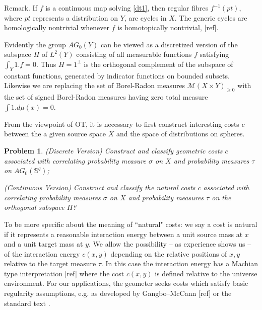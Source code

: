 \documentclass[12pt]{amsart}
\newtheorem{prob}{Problem}
\theoremstyle{definition}
\theoremstyle{remark}
\newcommand{\bZ}{\mathbb{Z}}
\begin{document}
Remark. If $f$ is a continuous map solving \ref{dt1}, then regular fibres $f^{-1}(pt)$, where $pt$ represents a distribution on $Y$, are cycles in $X$. The generic cycles are homologically nontrivial whenever $f$ is homotopically nontrivial, [ref].



Evidently the group $AG_0(Y)$ can be viewed as a discretized version of the subspace $H$ of $L^2(Y)$ consisting of all measurable functions $f$ satisfying $\int_Y 1. f=0$. Thus $H=1^{\perp}$ is the orthogonal complement of the subspace of constant functions, generated by indicator functions on bounded subsets. Likewise we are replacing the set of Borel-Radon measures $\mathscr{M}(X\times Y)_{\geq 0}$ with the set of signed Borel-Radon measures having zero total measure $\int 1. d\mu(x) =0$.

From the viewpoint of OT, it is necessary to first construct interesting costs $c$ between the a given source space $X$ and the space of distributions on spheres.

\begin{prob} 
(Discrete Version) Construct and classify geometric costs $c$ associated with correlating probability measure $\sigma$ on $X$ and probability measures $\tau$ on $AG_0(\mathbb{S}^q)$;

(Continuous Version) Construct and classify the natural costs $c$ associated with correlating probability measures $\sigma$ on $X$ and probability measures $\tau$ on the orthogonal subspace $H$? 
\end{prob}

To be more specific about the meaning of ``natural" costs: we say a cost is natural if it represents a reasonable interaction energy between a unit source mass at $x$ and a unit target mass at $y$. We allow the possibility -- as experience shows us -- of the interaction energy $c(x,y)$ depending on the relative positions of $x,y$ relative to the target measure $\tau$. In this case the interaction energy has a Machian type interpretation [ref] where the cost $c(x,y)$ is defined relative to the universe environment. For our applications, the geometer seeks costs which satisfy basic regularity assumptions, e.g. as developed by Gangbo--McCann [ref] or the standard text \cite{Vil1}. 
\end{document}
